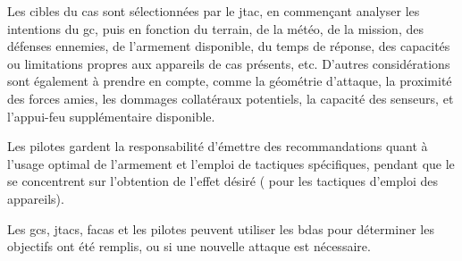 \begin{e1}
	\item Les cibles du \gls{cas} sont sélectionnées par le \gls{jtac}, en commençant analyser les intentions du \gls{gc}, puis en fonction du terrain, de la météo, de la mission, des défenses ennemies, de l'armement disponible, du temps de réponse, des capacités ou limitations propres aux appareils de \gls{cas} présents, etc. D'autres considérations sont également à prendre en compte, comme la géométrie d'attaque, la proximité des forces amies, les dommages collatéraux potentiels, la capacité des senseurs, et l'appui-feu supplémentaire disponible.
	
	Les pilotes gardent la responsabilité d'émettre des recommandations quant à l'usage optimal de l'armement et l'emploi de tactiques spécifiques, pendant que le \ja{} se concentrent sur l'obtention de l'effet désiré ( pour les tactiques d'emploi des appareils).
	
	Les \glspl{gc}, \glspl{jtac}, \glspl{faca} et les pilotes peuvent utiliser les \glspl{bda} pour déterminer les objectifs ont été remplis, ou si une nouvelle attaque est nécessaire.
\end{e1}
	
